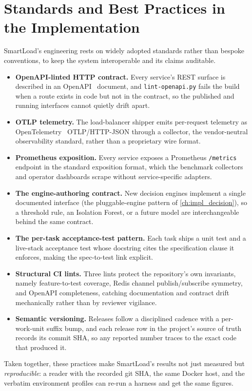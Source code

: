 \section{Standards and Best Practices in the Implementation}\label{imc:standards}

SmartLoad's engineering rests on widely adopted standards rather than bespoke
conventions, to keep the system interoperable and its claims auditable.

\begin{itemize}
  \item \textbf{OpenAPI-linted HTTP contract.} Every service's REST surface is
        described in an OpenAPI~\cite{openapi} document, and \texttt{lint-openapi.py}
        fails the build when a route exists in code but not in the contract, so the
        published and running interfaces cannot quietly drift apart.
  \item \textbf{OTLP telemetry.} The load-balancer shipper emits per-request
        telemetry as OpenTelemetry~\cite{opentelemetry} OTLP/HTTP-JSON through a
        collector, the vendor-neutral observability standard, rather than a
        proprietary wire format.
  \item \textbf{Prometheus exposition.} Every service exposes a Prometheus
        \cite{prometheus} \texttt{/metrics} endpoint in the standard exposition
        format, which the benchmark collectors and operator dashboards scrape without
        service-specific adapters.
  \item \textbf{The engine-authoring contract.} New decision engines implement a
        single documented interface (the pluggable-engine pattern of
        \cref{ch:impl_decision}), so a threshold rule, an Isolation Forest, or a future
        model are interchangeable behind the same contract.
  \item \textbf{The per-task acceptance-test pattern.} Each task ships a unit test and
        a live-stack acceptance test whose docstring cites the specification clause it
        enforces, making the spec-to-test link explicit.
  \item \textbf{Structural CI lints.} Three lints protect the repository's own
        invariants, namely feature-to-test coverage, Redis channel publish/subscribe
        symmetry, and OpenAPI completeness, catching documentation and contract drift
        mechanically rather than by reviewer vigilance.
  \item \textbf{Semantic versioning.} Releases follow a disciplined cadence with a
        per-work-unit suffix bump, and each release row in the project's source of
        truth records its commit SHA, so any reported number traces to the exact code
        that produced it.
\end{itemize}

Taken together, these practices make SmartLoad's results not just measured but
\emph{reproducible}: a reader with the recorded git SHA, the same Docker host, and the
verbatim environment profiles can re-run a harness and get the same figures.
